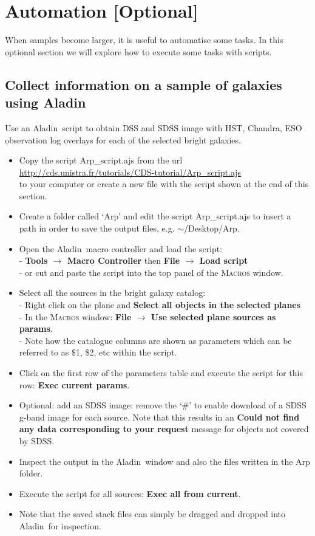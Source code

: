 \documentclass [a4paper, 12pt]{article}
\newcommand{\aladin}{{\textsc{A}{ladin}}}
\begin{document}
\section{Automation [Optional]}
When samples become larger, it is useful to automatise some tasks. In this 
optional section we will explore how to execute some tasks with 
scripts. 

\subsection{Collect information on a sample of galaxies using \aladin}

Use an \aladin\ script to obtain DSS and SDSS image with HST, Chandra, ESO 
observation log overlays for each of the selected bright galaxies.
\begin{itemize}
    \item Copy the script Arp\_script.ajs from the url \\
    \url{http://cds.unistra.fr/tutorials/CDS-tutorial/Arp_script.ajs} \\
     to your computer or create a new file with the script shown at the end
    of this section.
    \item Create a folder called `Arp' and edit the script Arp\_script.ajs to 
    insert a path in order to save the output files, e.g. $\sim$/Desktop/Arp.
    \item Open the \aladin\ macro controller and load the script:\\
    - \textbf{Tools $\rightarrow$ Macro Controller} then \textbf{File 
    $\rightarrow$ Load script}\\
    - or cut and paste the script into the top panel of the \textsc{Macros} 
    window.
    \item Select all the sources in the bright galaxy catalog:\\
    - Right click on the plane and \textbf{Select all objects in the selected 
    planes}\\
    - In the \textsc{Macros} window: \textbf{File $\rightarrow$ Use selected 
    plane sources as params}.\\
    - Note how the catalogue columns are shown as parameters which can be 
    referred to as \$1, \$2, etc within the script.
    \item Click on the first row of the parameters table and execute the 
script 
    for this row: \textbf{Exec current params}.
    \item Optional: add an SDSS image: remove the `\#' to enable download of a 
    SDSS g-band image for each source. Note that this results in an 
    \textbf{Could not find any data corresponding to your request} message for 
    objects not covered by SDSS.
    \item Inspect the output in the \aladin\ window and also the files written 
    in the Arp folder.
    \item Execute the script for all sources: \textbf{Exec all from current}.
    \item Note that the saved stack files can simply be dragged and dropped 
    into \aladin\ for inspection.
\end{itemize}
\end{document}
